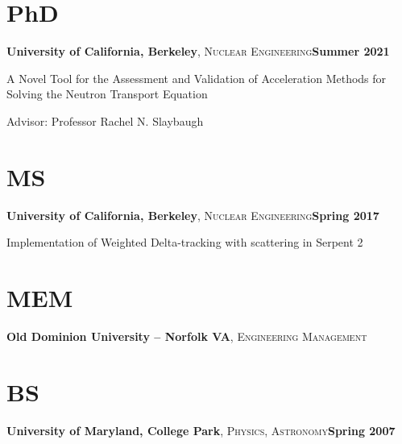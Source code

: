 \documentclass[margin,line]{resume}
\newcounter{daggerfootnote}
\newcommand*{\daggerfootnote}[1]{%
    \setcounter{daggerfootnote}{\value{footnote}}%
    \renewcommand*{\thefootnote}{\fnsymbol{footnote}}%
    \footnote[2]{#1}%
    \setcounter{footnote}{\value{daggerfootnote}}%
    \renewcommand*{\thefootnote}{\arabic{footnote}}%
}
\begin{document}
\begin{resume}
    \section{\mysidestyle PhD}
    \textbf{University of California, Berkeley}, \textsc{Nuclear
      Engineering}\hfill \textbf{Summer 2021}\vspace{-3mm}\\\vspace{-1mm}%
    \begin{list2}
        \item[] A Novel Tool for the Assessment and Validation of Acceleration Methods for Solving the Neutron Transport Equation
        \item[] Advisor:  Professor Rachel N. Slaybaugh
    \end{list2}\vspace{-1.5mm}
    \section{\mysidestyle MS}
    \textbf{University of California, Berkeley}, \textsc{Nuclear
      Engineering}\hfill\textbf{Spring 2017}\vspace{-3mm}\\\vspace{-1mm}%
    \begin{list2}
        \item[] Implementation of Weighted Delta-tracking with
          scattering in Serpent 2
        \end{list2}\vspace{-1.5mm}
    \section{\mysidestyle MEM}
    \textbf{Old Dominion University -- Norfolk VA},
    \textsc{Engineering Management}%
    \section{\mysidestyle BS}
    \textbf{University of Maryland, College Park},
    \textsc{Physics, Astronomy}\hfill\textbf{Spring 2007}\vspace{-3mm}\\\vspace{-1mm}%
\vspace{-1.5mm}

\end{resume}
\end{document}
